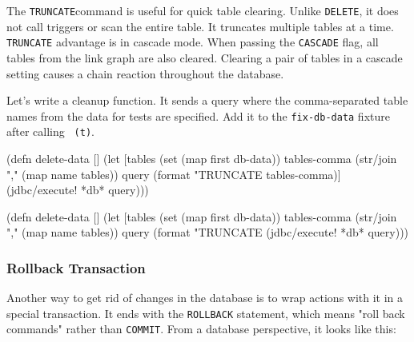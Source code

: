 
The \verb|TRUNCATE|command is useful for quick table clearing. Unlike \verb|DELETE|, it does not call triggers or scan the entire table. It truncates multiple tables at a time. \verb|TRUNCATE| advantage is in cascade mode. When passing the \verb|CASCADE| flag, all tables from the link graph are also cleared. Clearing a pair of tables in a cascade setting causes a chain reaction throughout the database.


Let's write a cleanup function. It sends a query where the comma-separated table names from the data for tests are specified. Add it to the \verb|fix-db-data| fixture after
calling \verb| (t)|.

\ifx\DEVICETYPE\MOBILE

\begin{english}
  \begin{clojure}
(defn delete-data []
  (let [tables (set (map first db-data))
        tables-comma
        (str/join "," (map name tables))
        query
        (format "TRUNCATE %
          tables-comma)]
    (jdbc/execute! *db* query)))
  \end{clojure}
\end{english}

\else

\begin{english}
  \begin{clojure}
(defn delete-data []
  (let [tables (set (map first db-data))
        tables-comma (str/join "," (map name tables))
        query (format "TRUNCATE %
    (jdbc/execute! *db* query)))
  \end{clojure}
\end{english}

\fi

\subsubsection*{Rollback Transaction}



Another way to get rid of changes in the database is to wrap actions with it in a special transaction. It ends with the \verb|ROLLBACK| statement, which means "roll back commands" rather than \verb|COMMIT|. From a database perspective, it looks like this:

